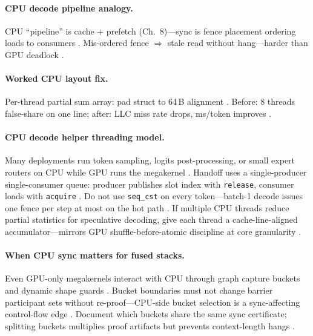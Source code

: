 \paragraph{CPU decode pipeline analogy.}
CPU ``pipeline'' is cache + prefetch (Ch.~8)---sync is fence placement ordering loads to consumers \citep{dlbook,yirage2026,patel2025llminference}.
Mis-ordered fence $\Rightarrow$ stale read without hang---harder than GPU deadlock \citep{chen2020compilerbasedhardw,taxbreak2026,memoryfloor2026}.

\paragraph{Worked CPU layout fix.}
Per-thread partial sum array: pad struct to 64\,B alignment \citep{dlbook,chen2020compilerbasedhardw}.
Before: 8 threads false-share on one line; after: LLC miss rate drops, ms/token improves \citep{patel2025llminference,memoryfloor2026,taxbreak2026}.

\paragraph{CPU decode helper threading model.}
Many deployments run token sampling, logits post-processing, or small expert routers on CPU while GPU runs the megakernel \citep{patel2025llminference,kwon2023vllm}.
Handoff uses a single-producer single-consumer queue: producer publishes slot index with \texttt{release}, consumer loads with \texttt{acquire} \citep{dlbook,yirage2026}.
Do not use \texttt{seq\_cst} on every token---batch-1 decode issues one fence per step at most on the hot path \citep{taxbreak2026,chen2020compilerbasedhardw}.
If multiple CPU threads reduce partial statistics for speculative decoding, give each thread a cache-line-aligned accumulator---mirrors GPU shuffle-before-atomic discipline at core granularity \citep{memoryfloor2026,patel2025llminference}.

\paragraph{When CPU sync matters for fused stacks.}
Even GPU-only megakernels interact with CPU through graph capture buckets and dynamic shape guards \citep{nvidia2024cudagraphs,yirage2026}.
Bucket boundaries must not change barrier participant sets without re-proof---CPU-side bucket selection is a sync-affecting control-flow edge \citep{shah2024flashattention3,patel2025llminference}.
Document which buckets share the same sync certificate; splitting buckets multiplies proof artifacts but prevents context-length hangs \citep{kwon2023vllm,taxbreak2026}.

